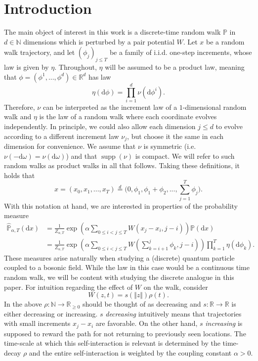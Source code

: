 \documentclass[reqno,11pt]{amsart}
\newcommand{\1}{\mathds{1}}
\theoremstyle{plain}
\theoremstyle{definition}
\numberwithin{equation}{section}
\DeclareMathOperator*{\supp}{\text{supp}}
\newcommand{\bbN}{{\mathbb N}}
\newcommand{\bbP}{{\mathbb P}}
\newcommand{\bbR}{{\mathbb R}}
\newcommand{\de}{{\mathrm{d}}}
\def\lt{\left}
\def\rt{\right}
\begin{document}
\section{Introduction}
The main object of interest in this work is a discrete-time random walk $\bbP$ in $d \in \bbN$ dimensions which is perturbed by a pair potential $W$. Let $x$ be a random walk trajectory, and let $(\phi_j)_{j \le T}$ be a family of i.i.d. one-step increments, whose law is given by $\eta$. Throughout, $\eta$ will be assumed to be a product law, meaning that $\phi = (\phi^1,...,\phi^d) \in \bbR^d$ has law
\[
\eta (\de \phi) = \prod \limits_{i=1} ^d \nu(\de \phi^i).
\]
Therefore, $\nu$ can be interpreted as the increment law of a $1$-dimensional random walk and $\eta$ is the law of a random walk where each coordinate evolves independently. In principle, we could also allow each dimension $j \le d$ to evolve according to a different increment law $\nu_j$, but choose it the same in each dimension for convenience.
We assume that $\nu$ is symmetric (i.e. $\nu(-\de \omega) = \nu (\de \omega)$) and that $\supp(\nu)$ is compact. We will refer to such random walks as product walks in all that follows.
Taking these definitions, it holds that
$$x = (x_0,x_1,...,x_T) \stackrel{d}{=} \Big(0,\phi_1, \phi_1 + \phi_2,...,\sum\limits_{j=1} ^T \phi_j \Big).$$
With this notation at hand, we are interested in properties of the probability measure
\begin{equation}
    \label{equ:perturbed_rw}
    \begin{split}
        \hat{\bbP}_{\alpha,T}(\de x) &=  \frac{1}{Z_{\alpha,T}} \exp \lt( \alpha \sum\limits_{0 \le i< j \le T} W( x_j - x_i , j-i ) \rt) \bbP(\de x) \\
        & = \frac{1}{Z_{\alpha,T}} \exp \lt( \alpha \sum\limits_{0 \le i< j \le T} W \lt( \sum\limits_{k = i+1} ^j \phi_k , j-i  \rt) \rt) \prod\limits_{k=1} ^T \eta (\de \phi_k).
    \end{split}
\end{equation}
These measures arise naturally when studying a (discrete) quantum particle coupled to a bosonic field. While the law in this case would be a continuous time random walk, we will be content with studying the discrete analogue in this paper. For intuition regarding the effect of $W$ on the walk, consider 
\[
W(z,t) = s(\Vert z \Vert) \rho(t).
\]
In the above $\rho: \bbN \rightarrow \bbR_{\ge 0}$ should be thought of as decreasing and $s : \bbR \rightarrow \bbR$ is either decreasing or increasing. $s$ \textit{decreasing} intuitively means that trajectories with small increments $x_j - x_i$ are favorable. On the other hand, $s$ \textit{increasing} is supposed to reward the path for not returning to previously seen locations. The time-scale at which this self-interaction is relevant is determined by the time-decay $\rho$ and the entire self-interaction is weighted by the coupling constant $\alpha > 0$. 
\end{document}

